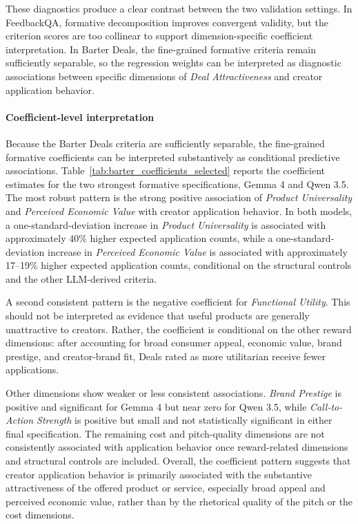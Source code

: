 These diagnostics produce a clear contrast between the two validation settings. In FeedbackQA, formative decomposition improves convergent validity, but the criterion scores are too collinear to support dimension-specific coefficient interpretation. In Barter Deals, the fine-grained formative criteria remain sufficiently separable, so the regression weights can be interpreted as diagnostic associations between specific dimensions of \textit{Deal Attractiveness} and creator application behavior.

\paragraph{Coefficient-level interpretation}

Because the Barter Deals criteria are sufficiently separable, the fine-grained formative coefficients can be interpreted substantively as conditional predictive associations. Table~\ref{tab:barter_coefficients_selected} reports the coefficient estimates for the two strongest formative specifications, Gemma 4 and Qwen 3.5. The most robust pattern is the strong positive association of \textit{Product Universality} and \textit{Perceived Economic Value} with creator application behavior. In both models, a one-standard-deviation increase in \textit{Product Universality} is associated with approximately 40\% higher expected application counts, while a one-standard-deviation increase in \textit{Perceived Economic Value} is associated with approximately 17--19\% higher expected application counts, conditional on the structural controls and the other LLM-derived criteria.

A second consistent pattern is the negative coefficient for \textit{Functional Utility}. This should not be interpreted as evidence that useful products are generally unattractive to creators. Rather, the coefficient is conditional on the other reward dimensions: after accounting for broad consumer appeal, economic value, brand prestige, and creator-brand fit, Deals rated as more utilitarian receive fewer applications.

Other dimensions show weaker or less consistent associations. \textit{Brand Prestige} is positive and significant for Gemma 4 but near zero for Qwen 3.5, while \textit{Call-to-Action Strength} is positive but small and not statistically significant in either final specification. The remaining cost and pitch-quality dimensions are not consistently associated with application behavior once reward-related dimensions and structural controls are included. Overall, the coefficient pattern suggests that creator application behavior is primarily associated with the substantive attractiveness of the offered product or service, especially broad appeal and perceived economic value, rather than by the rhetorical quality of the pitch or the cost dimensions. 


